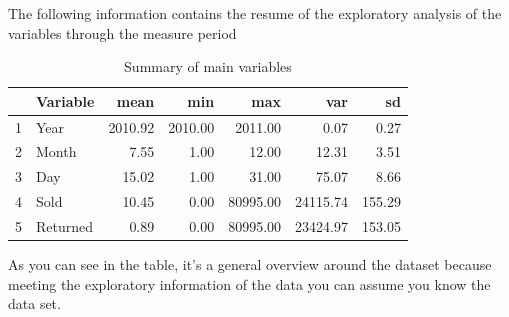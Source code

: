 \documentclass[conference]{IEEEtran}\usepackage[]{graphicx}\usepackage[]{color}
\begin{document}
 The following information contains the resume of the exploratory analysis of the variables through the measure period
\begin{table}[ht]
\centering
\begin{tabular}{rlrrrrr}
  \hline
 & Variable & mean & min & max & var & sd \\ 
  \hline
1 & Year & 2010.92 & 2010.00 & 2011.00 & 0.07 & 0.27 \\ 
  2 & Month & 7.55 & 1.00 & 12.00 & 12.31 & 3.51 \\ 
  3 & Day & 15.02 & 1.00 & 31.00 & 75.07 & 8.66 \\ 
  4 & Sold & 10.45 & 0.00 & 80995.00 & 24115.74 & 155.29 \\ 
  5 & Returned & 0.89 & 0.00 & 80995.00 & 23424.97 & 153.05 \\ 
   \hline
\end{tabular}
\caption{Summary of main variables} 
\end{table}

 
 As you can see in the table, it's a general overview around the dataset because meeting the exploratory information of the data you can assume you know the data set.


\end{document}
